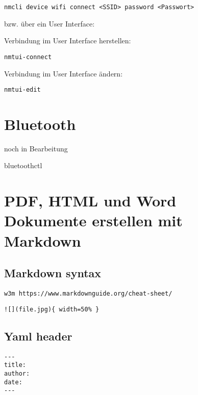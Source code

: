 \documentclass[]{book}
\begin{document}
\begin{verbatim}
nmcli device wifi connect <SSID> password <Passwort>
\end{verbatim}

bzw. über ein User Interface:

Verbindung im User Interface herstellen:

\begin{verbatim}
nmtui-connect
\end{verbatim}

Verbindung im User Interface ändern:

\begin{verbatim}
nmtui-edit
\end{verbatim}

\hypertarget{bluetooth}{%
\chapter{Bluetooth}\label{bluetooth}}

noch in Bearbeitung

bluetoothctl

\hypertarget{pdf-html-und-word-dokumente-erstellen-mit-markdown}{%
\chapter{PDF, HTML und Word Dokumente erstellen mit Markdown}\label{pdf-html-und-word-dokumente-erstellen-mit-markdown}}

\hypertarget{markdown-syntax}{%
\section{Markdown syntax}\label{markdown-syntax}}

\begin{verbatim}
w3m https://www.markdownguide.org/cheat-sheet/
\end{verbatim}

\begin{verbatim}
![](file.jpg){ width=50% }
\end{verbatim}

\hypertarget{yaml-header}{%
\section{Yaml header}\label{yaml-header}}

\begin{verbatim}
---
title:
author:
date:
---
\end{verbatim}
\end{document}
